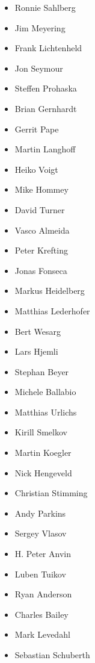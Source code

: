 \begin{frame}
{\begin{multicols}{7}
\begin{itemize}
                \item[] Ronnie Sahlberg
                \item[] Jim Meyering
                \item[] Frank Lichtenheld
                \item[] Jon Seymour
                \item[] Steffen Prohaska
                \item[] Brian Gernhardt
                \item[] Gerrit Pape
                \item[] Martin Langhoff
                \item[] Heiko Voigt
                \item[] Mike Hommey
                \item[] David Turner
                \item[] Vasco Almeida
                \item[] Peter Krefting
                \item[] Jonas Fonseca
                \item[] Markus Heidelberg
                \item[] Matthias Lederhofer
                \item[] Bert Wesarg
                \item[] Lars Hjemli
                \item[] Stephan Beyer
                \item[] Michele Ballabio
                \item[] Matthias Urlichs
                \item[] Kirill Smelkov
                \item[] Martin Koegler
                \item[] Nick Hengeveld
                \item[] Christian Stimming
                \item[] Andy Parkins
                \item[] Sergey Vlasov
                \item[] H. Peter Anvin
                \item[] Luben Tuikov
                \item[] Ryan Anderson
                \item[] Charles Bailey
                \item[] Mark Levedahl
                \item[] Sebastian Schuberth

\end{itemize}
\end{multicols}}
\end{frame}
